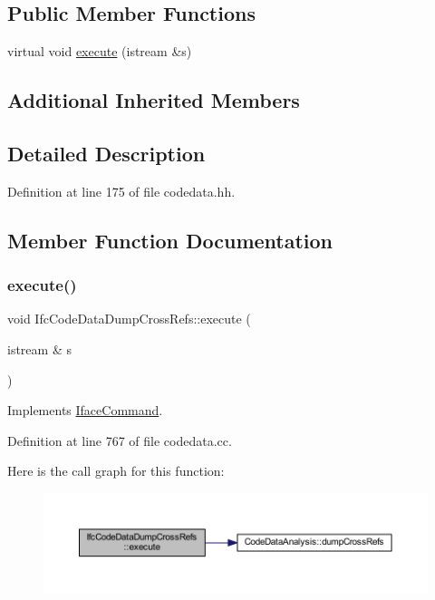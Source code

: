 \subsection*{Public Member Functions}
\begin{DoxyCompactItemize}
\item 
virtual void \mbox{\hyperlink{class_ifc_code_data_dump_cross_refs_a6524a8a49dcc7b1cd41657ea168d5eeb}{execute}} (istream \&s)
\end{DoxyCompactItemize}
\subsection*{Additional Inherited Members}


\subsection{Detailed Description}


Definition at line 175 of file codedata.\+hh.



\subsection{Member Function Documentation}
\mbox{\label{class_ifc_code_data_dump_cross_refs_a6524a8a49dcc7b1cd41657ea168d5eeb}} 
\subsubsection{\texorpdfstring{execute()}{execute()}}
{\footnotesize\ttfamily void Ifc\+Code\+Data\+Dump\+Cross\+Refs\+::execute (\begin{DoxyParamCaption}\item[{istream \&}]{s }\end{DoxyParamCaption})\hspace{0.3cm}{\ttfamily [virtual]}}



Implements \mbox{\hyperlink{class_iface_command_af10e29cee2c8e419de6efe9e680ad201}{Iface\+Command}}.



Definition at line 767 of file codedata.\+cc.

Here is the call graph for this function\+:
\nopagebreak
\begin{figure}[H]
\begin{center}
\leavevmode
\includegraphics[width=350pt]{class_ifc_code_data_dump_cross_refs_a6524a8a49dcc7b1cd41657ea168d5eeb_cgraph}
\end{center}
\end{figure}


